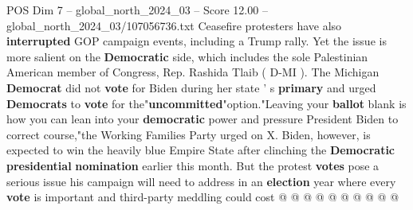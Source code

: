 \begin{textsample}{POS Dim 7 – global\_north\_2024\_03 – Score 12.00 – global\_north\_2024\_03/107056736.txt}
Ceasefire protesters have also \textbf{interrupted} GOP campaign events, including a Trump rally.
Yet the issue is more salient on the \textbf{Democratic} side, which includes the sole Palestinian American member of Congress, Rep.
Rashida Tlaib ( D-MI ).
The Michigan \textbf{Democrat} did not \textbf{vote} for Biden during her state ' s \textbf{primary} and urged \textbf{Democrats} to \textbf{vote} for the"\textbf{uncommitted}"option."Leaving your \textbf{ballot} blank is how you can lean into your \textbf{democratic} power and pressure President Biden to correct course,"the Working Families Party urged on X.
Biden, however, is expected to win the heavily blue Empire State after clinching the \textbf{Democratic} \textbf{presidential} \textbf{nomination} earlier this month.
But the protest \textbf{votes} pose a serious issue his campaign will need to address in an \textbf{election} year where every \textbf{vote} is important and third-party meddling could cost @ @ @ @ @ @ @ @ @ @

\end{textsample}
